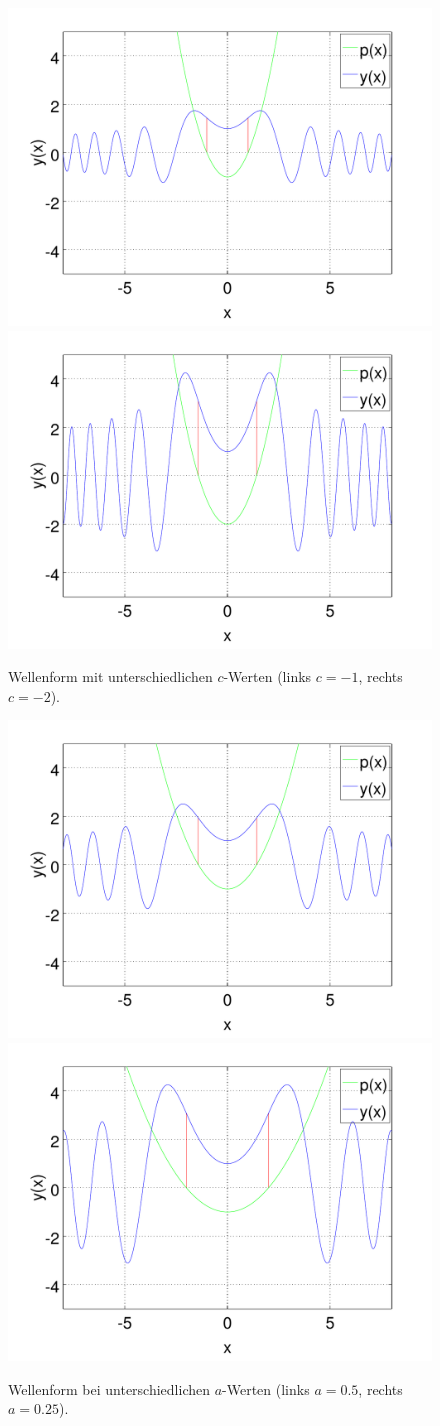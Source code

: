 \begin{figure}
	\includegraphics[width=0.5\hsize]{./wellen/images/varc/varc1.pdf}
	\includegraphics[width=0.5\hsize]{./wellen/images/varc/varc2.pdf}
	\caption{Wellenform mit unterschiedlichen $c$-Werten (links $c = -1$, 
	rechts $c = -2$).}
	\label{fig:wellen:variablec}
\end{figure}

\begin{figure}
	\includegraphics[width=0.5\hsize]{./wellen/images/vara/vara1.pdf}
	\includegraphics[width=0.5\hsize]{./wellen/images/vara/vara2.pdf}
	\caption{Wellenform bei unterschiedlichen $a$-Werten (links $a = 0.5$, 
	rechts $a = 0.25$).}
	\label{fig:wellen:variablea}
\end{figure}

